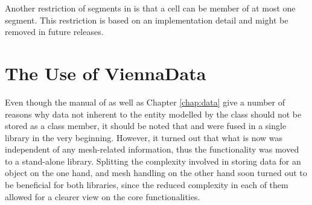  Another restriction of segments in {\ViennaGrid} is that a cell can be member of at most one segment.
 This restriction is based on an implementation detail and might be removed in future releases.

 \section{The Use of ViennaData}
 Even though the manual of {\ViennaData} as well as Chapter \ref{chap:data} give a number of reasons why data not inherent to the entity modelled by the class should not be stored as a class member, it should be noted that {\ViennaData} and {\ViennaGrid} were fused in a single library in the very beginning. 
 However, it turned out that what is now {\ViennaData} was independent of any mesh-related information, thus the functionality was moved to a stand-alone library.
 Splitting the complexity involved in storing data for an object on the one hand, and mesh handling on the other hand soon turned out to be beneficial for both libraries, since the reduced complexity in each of them allowed for a clearer view on the core functionalities.


